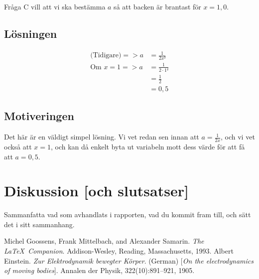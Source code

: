 \documentclass[a4paper,12pt]{article}
\begin{document}
    Fråga C vill att vi ska bestämma $a$ så att backen är brantast för $x = 1,0$.

  \subsection{Lösningen}
    \begin{align}
      \text{(Tidigare)}
      => a &= \frac{1}{2x²} 
      \nonumber \\
      \text{Om } 
      x = 1 => 
      a &= \frac{1}{2\cdot1²} 
      \nonumber \\
      &= \frac{1}{2} 
      \nonumber \\
      &= 0,5
    \end{align}

  \subsection{Motiveringen}
    Det här är en väldigt simpel lösning. Vi vet redan sen innan att 
    $a = \frac{1}{2x}$, och vi vet också att $x = 1$, och kan då enkelt byta ut
    variabeln mott dess värde för att få att $a = 0,5$.

\section{Diskussion [och slutsatser]}
\label{sec:disk}

Sammanfatta vad som avhandlats i rapporten, vad du kommit fram till,
och sätt det i sitt sammanhang. 
%
\begin{thebibliography}{99}
%
Michel Goossens, Frank Mittelbach, and Alexander Samarin. 
\textit{The \LaTeX\ Companion}. 
Addison-Wesley, Reading, Massachusetts, 1993.
%
Albert Einstein. 
\textit{Zur Elektrodynamik bewegter K{\"o}rper}. (German) 
[\textit{On the electrodynamics of moving bodies}]. 
Annalen der Physik, 322(10):891–921, 1905.
%
\end{thebibliography}
%
\end{document}
